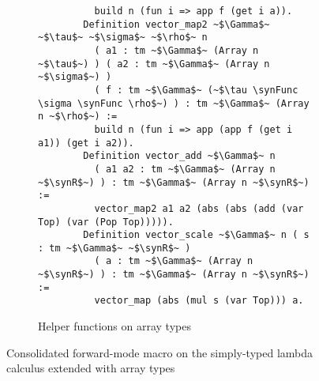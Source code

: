 \begin{figure}
\begin{subfigure}{1\textwidth}
\begin{verbatim}
          build n (fun i => app f (get i a)).
        Definition vector_map2 ~$\Gamma$~ ~$\tau$~ ~$\sigma$~ ~$\rho$~ n
          ( a1 : tm ~$\Gamma$~ (Array n ~$\tau$~) ) ( a2 : tm ~$\Gamma$~ (Array n ~$\sigma$~) )
          ( f : tm ~$\Gamma$~ (~$\tau \synFunc \sigma \synFunc \rho$~) ) : tm ~$\Gamma$~ (Array n ~$\rho$~) :=
          build n (fun i => app (app f (get i a1)) (get i a2)).
        Definition vector_add ~$\Gamma$~ n
          ( a1 a2 : tm ~$\Gamma$~ (Array n ~$\synR$~) ) : tm ~$\Gamma$~ (Array n ~$\synR$~) :=
          vector_map2 a1 a2 (abs (abs (add (var Top) (var (Pop Top))))).
        Definition vector_scale ~$\Gamma$~ n ( s : tm ~$\Gamma$~ ~$\synR$~ )
          ( a : tm ~$\Gamma$~ (Array n ~$\synR$~) ) : tm ~$\Gamma$~ (Array n ~$\synR$~) :=
          vector_map (abs (mul s (var Top))) a.
      \end{verbatim}
      \caption{Helper functions on array types}
    \end{subfigure}
    \caption{Consolidated forward-mode macro on the simply-typed lambda calculus extended with array types}
    \label{fig:forward_mode_cont}
  \end{figure}

